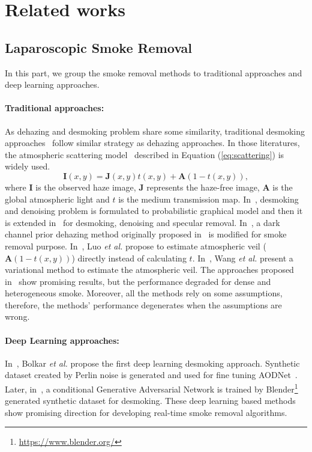 \documentclass[pmlr]{jmlr}
\begin{document}
\section{Related works}
\label{sec:related work}

\subsection{Laparoscopic Smoke Removal}
In this part, we group the smoke removal methods to traditional approaches and deep learning approaches.  

\paragraph{Traditional approaches:} As dehazing and desmoking problem share some similarity, traditional desmoking approaches~\citep{wang2018variational,kotwal2016joint,baid2017joint,tchakaa2017chromaticity,luo2017vision} follow similar strategy as dehazing approaches. In those literatures, the atmospheric scattering model~\citep{narasimhan2002vision} described in Equation (\ref{eq:scattering}) is widely used. 
\begin{equation}
\label{eq:scattering}
\mathbf{I}(x,y)=\mathbf{J}(x,y)t(x,y)+\mathbf{A}(1-t(x,y)),
\end{equation}
where $\mathbf{I}$ is the observed haze image, $\mathbf{J}$ represents the haze-free image, $\mathbf{A}$ is the global atmospheric light and $t$ is the medium transmission map. In~\citep{kotwal2016joint}, desmoking and denoising problem is formulated to probabilistic graphical model and then it is extended in~\citep{baid2017joint} for desmoking, denoising and specular removal. In~\citep{tchakaa2017chromaticity}, a dark channel prior dehazing method originally proposed in~\citep{he2011single} is modified for smoke removal purpose. In~\citep{luo2017vision}, Luo \textit{et al.} propose to estimate atmospheric veil ($\textbf{A}(1-t(x,y))$) directly instead of calculating $t$. In~\citep{wang2018variational}, Wang \textit{et al.} present a variational method to estimate the atmospheric veil. The approaches proposed in~\citep{luo2017vision,wang2018variational} show promising results, but the performance degraded for dense and heterogeneous smoke. Moreover, all the methods rely on some assumptions, therefore, the methods' performance degenerates when the assumptions are wrong.

\paragraph{Deep Learning approaches:} In~\citep{sabri2018}, Bolkar \textit{et al.} propose the first deep learning desmoking approach. Synthetic dataset created by Perlin noise is generated and used for fine tuning AODNet~\citep{li2017aod}. Later, in~\citep{chen2018unsupervised}, a conditional Generative Adversarial Network is trained by Blender\footnote{ \url{https://www.blender.org/}} generated synthetic dataset for desmoking. These deep learning based methods show promising direction for developing real-time smoke removal algorithms. 
\end{document}
